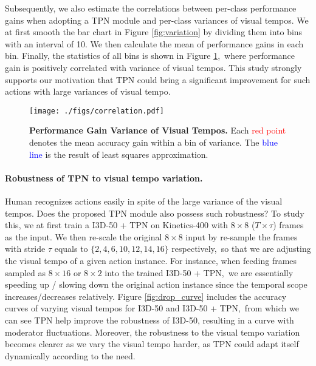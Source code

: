 \documentclass[10pt,twocolumn,letterpaper]{article}
\begin{document}
Subsequently, we also estimate the correlations between per-class performance gains when adopting a TPN module and per-class variances of visual tempos.
We at first smooth the bar chart in Figure \ref{fig:variation} by dividing them into bins with an interval of 10.
We then calculate the mean of performance gains in each bin.
Finally, the statistics of all bins is shown in Figure \ref{fig:correlation},\
where performance gain is positively correlated with variance of visual tempos.
This study strongly supports our motivation that TPN could bring a significant improvement for such actions with large variances of visual tempo.


\begin{figure}[t]
    \centering
    \texttt{[image: ./figs/correlation.pdf]}
    \caption{
        \textbf{Performance Gain \vs Variance of Visual Tempos.}
        Each \textcolor{red}{red point} denotes the mean accuracy gain within a bin of variance.
        The \textcolor{blue}{blue line} is the result of least squares approximation. 
    }
    \label{fig:correlation}
\end{figure}


\paragraph{Robustness of TPN to visual tempo variation.}

Human recognizes actions easily in spite of the large variance of the visual tempos.
Does the proposed TPN module also possess such robustness?
To study this, we at first train a I3D-50 + TPN on Kinetics-400 \cite{kinetics} with $8 \times 8$ ($T \times \tau$) frames as the input.
We then re-scale the original $8\times8$ input by re-sample the frames with stride $\tau$ equals to $\{2,4,6,10,12,14,16\}$ respectively,\
so that we are adjusting the visual tempo of a given action instance.
For instance, when feeding frames sampled as $8 \times 16$ or $8 \times 2$ into the trained I3D-50 + TPN,\
we are essentially speeding up / slowing down the original action instance since the temporal scope increases/decreases relatively.
Figure \ref{fig:drop_curve} includes the accuracy curves of varying visual tempos for I3D-50 and I3D-50 + TPN,\
from which we can see TPN help improve the robustness of I3D-50, resulting in a curve with moderator fluctuations.
Moreover, the robustness to the visual tempo variation becomes clearer as we vary the visual tempo harder, as TPN could adapt itself dynamically according to the need.
\end{document}
